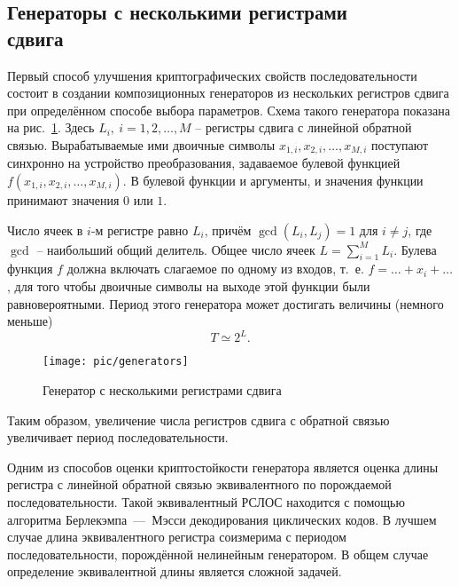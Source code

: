\subsection[Генераторы с несколькими регистрами сдвига]{Генераторы с несколькими регистрами \protect\\ сдвига}

Первый способ улучшения криптографических свойств последовательности состоит в создании композиционных генераторов из нескольких регистров сдвига при определённом способе выбора параметров. Схема такого генератора показана на рис.~\ref{fig:generators}. Здесь $L_i, ~ i = 1, 2, \dots, M$ -- регистры сдвига с линейной обратной связью. Вырабатываемые ими двоичные символы $x_{1,i}, x_{2,i}, \dots, x_{M,i}$ поступают синхронно на устройство преобразования, задаваемое булевой функцией $f(x_{1,i}, x_{2,i}, \dots, x_{M,i})$. В булевой функции и аргументы, и значения функции принимают значения $0$ или $1$.

Число ячеек в $i$-м регистре равно $L_{i}$, причём $\gcd(L_i, L_j)=1$ для $i \neq j$, где $\gcd$ -- наибольший общий делитель. Общее число ячеек $L = \sum\limits_{i=1}^M L_i$. Булева функция $f$ должна включать слагаемое по одному из входов, т.~е. $f = \dots + x_i + \dots$, для того чтобы двоичные символы на выходе этой функции были равновероятными. Период этого генератора может достигать величины (немного меньше)
    \[ T \simeq 2^L. \]

\begin{figure}[!ht]
	\centering
	\texttt{[image: pic/generators]}
    \caption{Генератор с несколькими регистрами сдвига\label{fig:generators}}
\end{figure}

Таким образом, увеличение числа регистров сдвига с обратной связью увеличивает период последовательности.

Одним из способов оценки криптостойкости генератора является оценка длины регистра с линейной обратной связью эквивалентного по порождаемой последовательности. Такой эквивалентный РСЛОС находится с помощью алгоритма Берлекэмпа~---~Мэсси декодирования циклических кодов. В лучшем случае длина эквивалентного регистра соизмерима с периодом последовательности, порождённой нелинейным генератором. В общем случае определение эквивалентной длины является сложной задачей.
